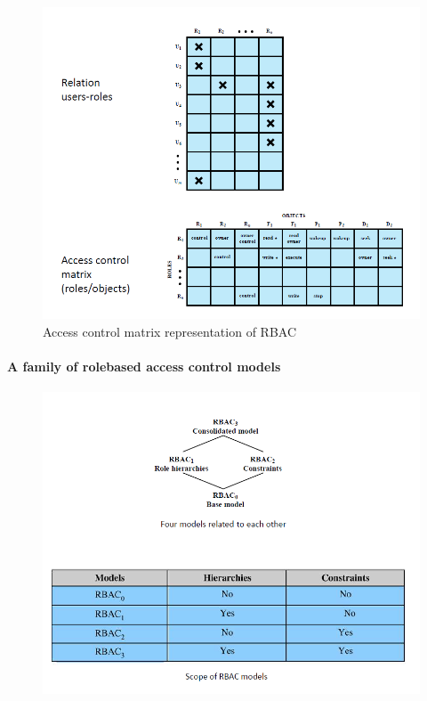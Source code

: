 \documentclass{article}
\begin{document}
        \begin{figure}[h]
            \begin{center}
                \includegraphics[scale=0.6]{../immagini/access_control_matrix.png}
            \end{center}
            \caption{Access control
            matrix
            representation of
            RBAC}
            
        \end{figure}
        \paragraph{A family of rolebased
        access
        control models}
        \begin{figure}[h]
            \begin{center}
                \includegraphics[scale=0.6]{../immagini/table.png}
            \end{center}
           
            
        \end{figure}
\end{document}
